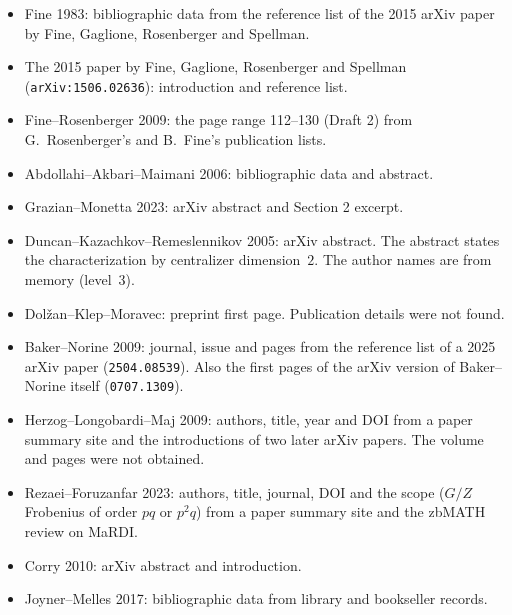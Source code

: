 \documentclass[12pt,letterpaper]{article}
\begin{document}
\begin{itemize}[itemsep=1pt]
  not consulted.
\item Fine 1983: bibliographic data from the reference list of the 2015
  arXiv paper by Fine, Gaglione, Rosenberger and Spellman.
\item The 2015 paper by Fine, Gaglione, Rosenberger and Spellman
  (\texttt{arXiv:1506.02636}): introduction and reference list.
\item Fine--Rosenberger 2009: the page range 112--130 (Draft 2) from
  G.~Rosenberger's and B.~Fine's publication lists.
\item Abdollahi--Akbari--Maimani 2006: bibliographic data and abstract.
\item Grazian--Monetta 2023: arXiv abstract and Section 2 excerpt.
\item Duncan--Kazachkov--Remeslennikov 2005: arXiv abstract. The abstract
  states the characterization by centralizer dimension~$2$. The author names
  are from memory (level~3).
\item Dol\v{z}an--Klep--Moravec: preprint first page. Publication details
  were not found.
\item Baker--Norine 2009: journal, issue and pages from the reference list
  of a 2025 arXiv paper (\texttt{2504.08539}). Also the first pages of the
  arXiv version of Baker--Norine itself (\texttt{0707.1309}).
\item Herzog--Longobardi--Maj 2009: authors, title, year and DOI from a
  paper summary site and the introductions of two later arXiv papers. The
  volume and pages were not obtained.
\item Rezaei--Foruzanfar 2023: authors, title, journal, DOI and the scope
  ($G/Z$ Frobenius of order $pq$ or $p^2q$) from a paper summary site and
  the zbMATH review on MaRDI.
\item Corry 2010: arXiv abstract and introduction.
\item Joyner--Melles 2017: bibliographic data from library and bookseller
  records.
\end{itemize}
\end{document}
